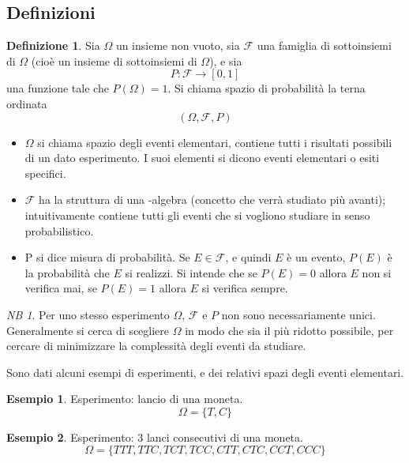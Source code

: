 \documentclass{article}
\theoremstyle{plain}
\theoremstyle{definition}
\newtheorem{definizione}{Definizione}[section]
\newtheorem{esempio}{Esempio}[section]
\theoremstyle{remark}
\newtheorem*{NB}{NB}
\begin{document}
\subsection{Definizioni} %
\label{sub:definizioni}
\begin{definizione}
	Sia $\Omega$ un insieme non vuoto, sia $\mathscr{F}$ una famiglia di sottoinsiemi di $\Omega$ (cioè un insieme di sottoinsiemi di $\Omega$), e sia
	\begin{equation*}
		P:\mathscr{F}\to[0,1]
	\end{equation*}
	una funzione tale che $P(\Omega)=1$. Si chiama spazio di probabilità la terna ordinata
	\begin{equation*}
		(\Omega,\mathscr{F},P)
	\end{equation*}
\end{definizione}
\begin{itemize}
	\item $\Omega$ si chiama spazio degli eventi elementari, contiene tutti i risultati possibili di un dato esperimento. I suoi elementi si dicono eventi elementari o esiti specifici.
	\item $\mathscr{F}$ ha la struttura di una \sigma-algebra (concetto che verrà studiato più avanti); intuitivamente contiene tutti gli eventi che si vogliono studiare in senso probabilistico.
	\item P si dice misura di probabilità. Se $E\in\mathscr{F}$, e quindi $E$ è un evento, $P(E)$ è la probabilità che $E$ si realizzi. Si intende che se $P(E)=0$ allora $E$ non si verifica mai, se $P(E)=1$ allora $E$ si verifica sempre.
\end{itemize}
\begin{NB}
	Per uno stesso esperimento $\Omega$, $\mathscr{F}$ e $P$ non sono necessariamente unici. Generalmente si cerca di scegliere $\Omega$ in modo che sia il più ridotto possibile, per cercare di minimizzare la complessità degli eventi da studiare.
\end{NB}
Sono dati alcuni esempi di esperimenti, e dei relativi spazi degli eventi elementari.
\begin{esempio}
	Esperimento: lancio di una moneta.
	\begin{equation*}
		\Omega=\{T,C\}
	\end{equation*}
\end{esempio}
\begin{esempio}
	Esperimento: 3 lanci consecutivi di una moneta.
	\begin{equation*}
		\Omega=\{TTT, TTC, TCT, TCC, CTT, CTC, CCT, CCC\}
	\end{equation*}
\end{esempio}
\end{document}
